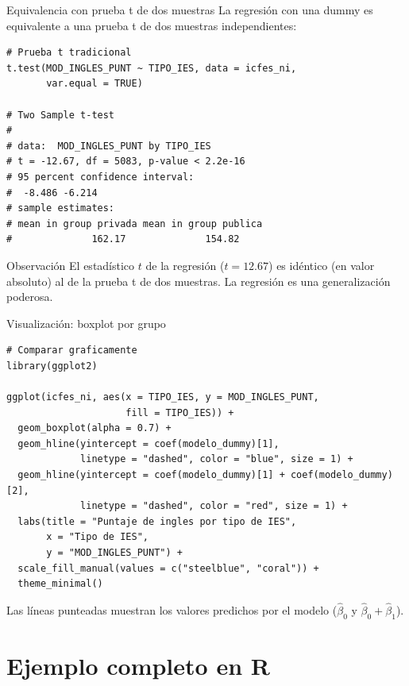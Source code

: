 \documentclass[aspectratio=169, 11pt]{beamer}
\begin{document}
\begin{frame}[fragile]{Equivalencia con prueba t de dos muestras}
La regresi\'on con una dummy es equivalente a una prueba t de dos muestras independientes:

\begin{lstlisting}[basicstyle=\ttfamily\scriptsize,aboveskip=0pt,belowskip=0pt]
# Prueba t tradicional
t.test(MOD_INGLES_PUNT ~ TIPO_IES, data = icfes_ni,
       var.equal = TRUE)

# Two Sample t-test
#
# data:  MOD_INGLES_PUNT by TIPO_IES
# t = -12.67, df = 5083, p-value < 2.2e-16
# 95 percent confidence interval:
#  -8.486 -6.214
# sample estimates:
# mean in group privada mean in group publica
#              162.17              154.82
\end{lstlisting}

\begin{block}{Observaci\'on}
\small El estad\'istico $t$ de la regresi\'on ($t = 12.67$) es id\'entico (en valor absoluto) al de la prueba t de dos muestras. La regresi\'on es una generalizaci\'on poderosa.
\end{block}
\end{frame}

\begin{frame}[fragile]{Visualización: boxplot por grupo}
\begin{lstlisting}
# Comparar graficamente
library(ggplot2)

ggplot(icfes_ni, aes(x = TIPO_IES, y = MOD_INGLES_PUNT,
                     fill = TIPO_IES)) +
  geom_boxplot(alpha = 0.7) +
  geom_hline(yintercept = coef(modelo_dummy)[1],
             linetype = "dashed", color = "blue", size = 1) +
  geom_hline(yintercept = coef(modelo_dummy)[1] + coef(modelo_dummy)[2],
             linetype = "dashed", color = "red", size = 1) +
  labs(title = "Puntaje de ingles por tipo de IES",
       x = "Tipo de IES",
       y = "MOD_INGLES_PUNT") +
  scale_fill_manual(values = c("steelblue", "coral")) +
  theme_minimal()
\end{lstlisting}

Las líneas punteadas muestran los valores predichos por el modelo ($\hat{\beta}_0$ y $\hat{\beta}_0 + \hat{\beta}_1$).
\end{frame}

\section{Ejemplo completo en R}
\end{document}

